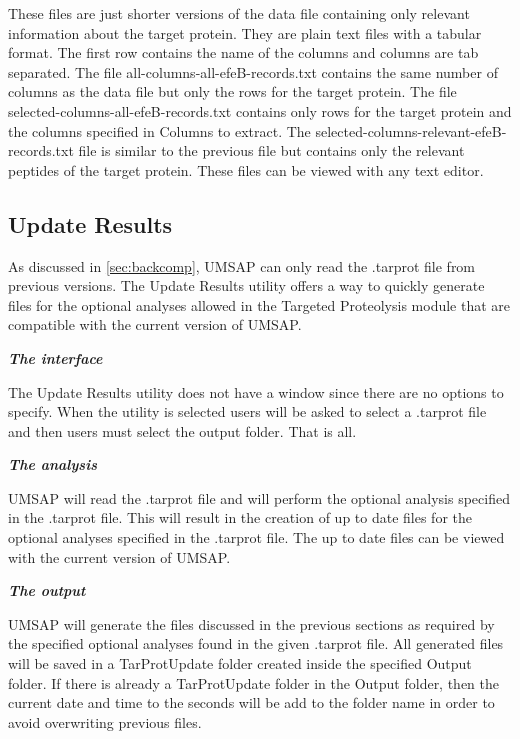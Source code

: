 These files are just shorter versions of the data file containing only relevant information about the target protein. They are plain text files with a tabular format. The first row contains the name of the columns and columns are tab separated. The file all-columns-all-efeB-records.txt contains the same number of columns as the data file but only the rows for the target protein. The file selected-columns-all-efeB-records.txt contains only rows for the target protein and the columns specified in Columns to extract. The selected-columns-relevant-efeB-records.txt file is similar to the previous file but contains only the relevant peptides of the target protein. These files can be viewed with any text editor.

\subsection{Update Results}
\label{subsec:updateres}

As discussed in \autoref{sec:backcomp}, UMSAP can only read the .tarprot file from previous versions. The Update Results utility offers a way to quickly generate files for the optional analyses allowed in the Targeted Proteolysis module that are compatible with the current version of UMSAP.

\textit{\textbf{The interface}}

The Update Results utility does not have a window since there are no options to specify. When the utility is selected users will be asked to select a .tarprot file and then users must select the output folder. That is all.

\textit{\textbf{The analysis}}

UMSAP will read the .tarprot file and will perform the optional analysis specified in the .tarprot file. This will result in the creation of up to date files for the optional analyses specified in the .tarprot file. The up to date files can be viewed with the current version of UMSAP.

\textit{\textbf{The output}}

UMSAP will generate the files discussed in the previous sections as required by the specified optional analyses found in the given .tarprot file. All generated files will be saved in a TarProtUpdate folder created inside the specified Output folder. If there is already a TarProtUpdate folder in the Output folder, then the current date and time to the seconds will be add to the folder name in order to avoid overwriting previous files. 

